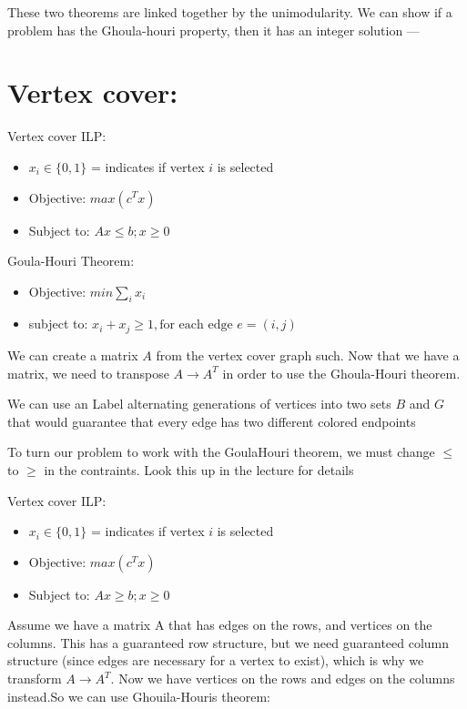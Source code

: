 \documentclass[11pt]{article}
\begin{document}
These two theorems are linked together by the unimodularity. We can show if a problem has the Ghoula-houri property, then it has an integer solution
---

\section{Vertex cover:}
\label{sec:org49681d7}

Vertex cover ILP:
\begin{itemize}
\item \(x_i \in \{ 0,1\}\) = indicates if vertex \(i\) is selected
\item Objective: \(max(c^T x)\)
\item Subject to: \(A x \leq b ; x \geq 0\)
\end{itemize}

Goula-Houri Theorem:
\begin{itemize}
\item Objective: \(min \sum_i x_i\)
\item subject to: \(x_i + x_j \geq 1, \text{for each edge } e = (i,j)\)
\end{itemize}

We can create a matrix \(A\) from the vertex cover graph such. Now that we have a matrix, we need to transpose \(A \rightarrow A^T\) in order to use the Ghoula-Houri theorem.

We can use an Label alternating generations of vertices into two sets \(B\) and \(G\) that would guarantee that every edge has two different colored endpoints

To turn our problem to work with the GoulaHouri theorem, we must change \(\leq\) to \(\geq\) in the contraints. Look this up in the lecture for details 

Vertex cover ILP:
\begin{itemize}
\item \(x_i \in \{ 0,1\}\) = indicates if vertex \(i\) is selected
\item Objective: \(max(c^T x)\)
\item Subject to: \(A x \geq b ; x \geq 0\)
\end{itemize}

Assume we have a matrix A that has edges on the rows, and vertices on the columns.
This has a guaranteed row structure, but we need guaranteed column structure (since edges are necessary for a vertex to exist), which is why we transform \(A \rightarrow A^T\).
Now we have vertices on the rows and edges on the columns instead.So we can use Ghouila-Houris theorem:
\end{document}
